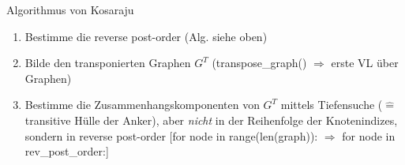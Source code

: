    Algorithmus von Kosaraju
    \begin{enumerate}
        \item Bestimme die reverse post-order (Alg. siehe oben)
        \item Bilde den transponierten Graphen $G^T$ (transpose\_graph() $\Rightarrow$ erste VL über Graphen)
        \item Bestimme die Zusammenhangskomponenten von $G^T$ mittels Tiefensuche ($\widehat{=}$ transitive Hülle der Anker), aber \emph{nicht} in der Reihenfolge der Knotenindizes, sondern in reverse post-order [for node in range(len(graph)): $\Rightarrow$ for node in rev\_post\_order:]
    \end{enumerate}


